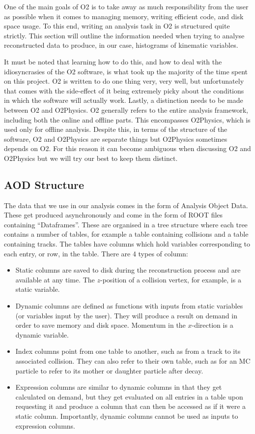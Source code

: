 One of the main goals of O2 is to take away as much responsibility from the user as possible when it comes to managing memory, writing efficient code, and disk space usage. To this end, writing an analysis task in O2 is structured quite strictly. This section will outline the information needed when trying to analyse reconstructed data to produce, in our case, histograms of kinematic variables. 

It must be noted that learning how to do this, and how to deal with the idiosyncrasies of the O2 software, is what took up the majority of the time spent on this project. O2 is written to do one thing very, very well, but unfortunately that comes with the side-effect of it being extremely picky about the conditions in which the software will actually work. Lastly, a distinction needs to be made between O2 and O2Physics. O2 generally refers to the entire analysis framework, including both the online and offline parts. This encompasses O2Physics, which is used only for offline analysis. Despite this, in terms of the structure of the software, O2 and O2Physics are separate things but O2Physics sometimes depends on O2. For this reason it can become ambiguous when discussing O2 and O2Physics but we will try our best to keep them distinct. 

\subsection{AOD Structure}\label{sec:AODStructure}
The data that we use in our analysis comes in the form of Analysis Object Data. These get produced asynchronously and come in the form of ROOT files containing ``Dataframes''. These are organised in a tree structure where each tree contains a number of tables, for example a table containing collisions and a table containing tracks. The tables have columns which hold variables corresponding to each entry, or row, in the table. There are 4 types of column:

\begin{itemize}
    \item Static columns are saved to disk during the reconstruction process and are available at any time. The $z$-position of a collision vertex, for example, is a static variable.
    \item Dynamic columns are defined as functions with inputs from static variables (or variables input by the user). They will produce a result on demand in order to save memory and disk space. Momentum in the $x$-direction is a dynamic variable.
    \item Index columns point from one table to another, such as from a track to its associated collision. They can also refer to their own table, such as for an MC particle to refer to its mother or daughter particle after decay.
    \item Expression columns are similar to dynamic columns in that they get calculated on demand, but they get evaluated on all entries in a table upon requesting it and produce a column that can then be accessed as if it were a static column. Importantly, dynamic columns cannot be used as inputs to expression columns.
\end{itemize}

